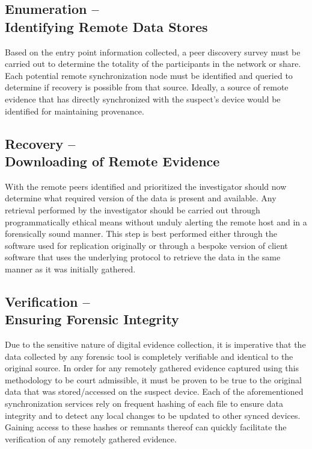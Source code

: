 \documentclass{jdfsl}
\begin{document}
\subsection{Enumeration --\\ Identifying Remote Data Stores}
Based on the entry point information collected, a peer discovery survey must be carried out to determine the totality of the participants in the network or share. Each potential remote synchronization node must be identified and queried to determine if recovery is possible from that source. Ideally, a source of remote evidence that has directly synchronized with the suspect's device would be identified for maintaining provenance.\\


\subsection{Recovery -- \\Downloading of Remote Evidence}
With the remote peers identified and prioritized the investigator should now determine what required version of the data is present and available. Any retrieval performed by the investigator should be carried out through programmatically ethical means without unduly alerting the remote host and in a forensically sound manner. This step is best performed either through the software used for replication originally or through a bespoke version of client software that uses the underlying protocol to retrieve the data in the same manner as it was initially gathered.\\

\subsection{Verification -- \\Ensuring Forensic Integrity}
Due to the sensitive nature of digital evidence collection, it is imperative that the data collected by any forensic tool is completely verifiable and identical to the original source. In order for any remotely gathered evidence captured using this methodology to be court admissible, it must be proven to be true to the original data that was stored/accessed on the suspect device. Each of the aforementioned synchronization services rely on frequent hashing of each file to ensure data integrity and to detect any local changes to be updated to other synced devices. Gaining access to these hashes or remnants thereof can quickly facilitate the verification of any remotely gathered evidence.\\
\end{document}
